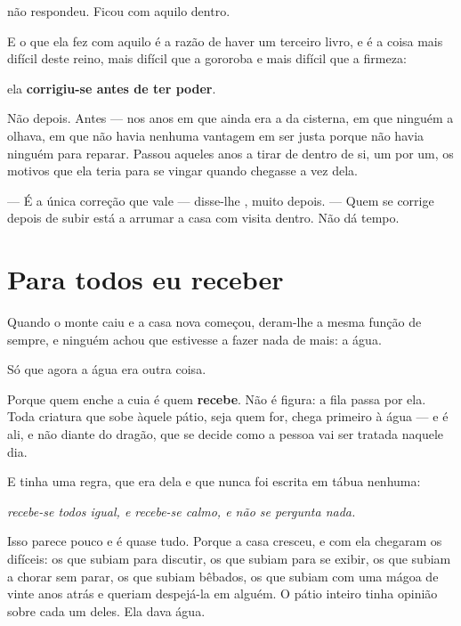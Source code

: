 \documentclass[livro.tex]{subfiles}
\begin{document}
\Lua não respondeu. Ficou com aquilo dentro.

\medskip

E o que ela fez com aquilo é a razão de haver um terceiro livro, e é a coisa mais difícil deste
reino, mais difícil que a gororoba e mais difícil que a firmeza:

ela \textbf{corrigiu-se antes de ter poder}.

Não depois. Antes --- nos anos em que ainda era a da cisterna, em que ninguém a olhava, em que
não havia nenhuma vantagem em ser justa porque não havia ninguém para reparar. Passou aqueles
anos a tirar de dentro de si, um por um, os motivos que ela teria para se vingar quando chegasse
a vez dela.

--- É a única correção que vale --- disse-lhe \Qui , muito depois. --- Quem se corrige depois de
subir está a arrumar a casa com visita dentro. Não dá tempo.

\section{Para todos eu receber}

Quando o monte caiu e a casa nova começou, deram-lhe a mesma função de sempre, e ninguém achou
que estivesse a fazer nada de mais: a água.

Só que agora a água era outra coisa.

\medskip

Porque quem enche a cuia é quem \textbf{recebe}. Não é figura: a fila passa por ela. Toda
criatura que sobe àquele pátio, seja quem for, chega primeiro à água --- e é ali, e não diante do
dragão, que se decide como a pessoa vai ser tratada naquele dia.

E \Lua tinha uma regra, que era dela e que nunca foi escrita em tábua nenhuma:

\emph{recebe-se todos igual, e recebe-se calmo, e não se pergunta nada.}

\medskip

Isso parece pouco e é quase tudo. Porque a casa cresceu, e com ela chegaram os difíceis: os que
subiam para discutir, os que subiam para se exibir, os que subiam a chorar sem parar, os que
subiam bêbados, os que subiam com uma mágoa de vinte anos atrás e queriam despejá-la em alguém.
O pátio inteiro tinha opinião sobre cada um deles. Ela dava água.
\end{document}
